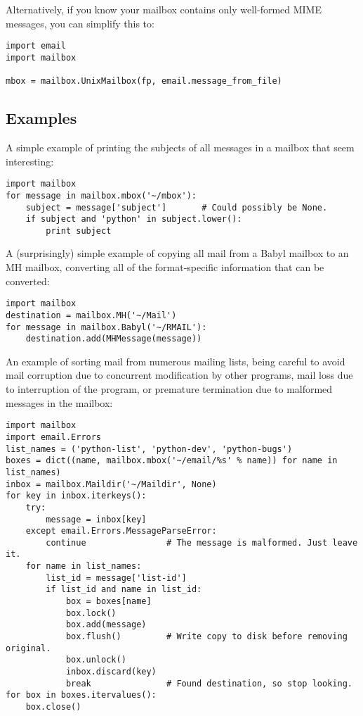 Alternatively, if you know your mailbox contains only well-formed MIME
messages, you can simplify this to:

\begin{verbatim}
import email
import mailbox

mbox = mailbox.UnixMailbox(fp, email.message_from_file)
\end{verbatim}

\subsection{Examples}
\label{mailbox-examples}

A simple example of printing the subjects of all messages in a mailbox that
seem interesting:

\begin{verbatim}
import mailbox
for message in mailbox.mbox('~/mbox'):
    subject = message['subject']       # Could possibly be None.
    if subject and 'python' in subject.lower():
        print subject
\end{verbatim}

A (surprisingly) simple example of copying all mail from a Babyl mailbox to an
MH mailbox, converting all of the format-specific information that can be
converted:

\begin{verbatim}
import mailbox
destination = mailbox.MH('~/Mail')
for message in mailbox.Babyl('~/RMAIL'):
    destination.add(MHMessage(message))
\end{verbatim}

An example of sorting mail from numerous mailing lists, being careful to avoid
mail corruption due to concurrent modification by other programs, mail loss due
to interruption of the program, or premature termination due to malformed
messages in the mailbox:

\begin{verbatim}
import mailbox
import email.Errors
list_names = ('python-list', 'python-dev', 'python-bugs')
boxes = dict((name, mailbox.mbox('~/email/%s' % name)) for name in list_names)
inbox = mailbox.Maildir('~/Maildir', None)
for key in inbox.iterkeys():
    try:
        message = inbox[key]
    except email.Errors.MessageParseError:
        continue                # The message is malformed. Just leave it.
    for name in list_names:
        list_id = message['list-id']
        if list_id and name in list_id:
            box = boxes[name]
            box.lock()
            box.add(message)
            box.flush()         # Write copy to disk before removing original.
            box.unlock()
            inbox.discard(key)
            break               # Found destination, so stop looking.
for box in boxes.itervalues():
    box.close()
\end{verbatim}
